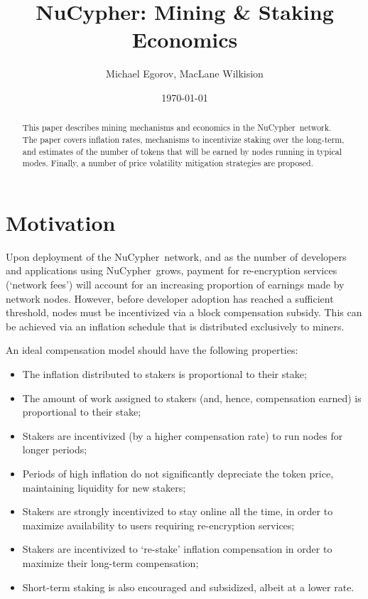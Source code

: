 \documentclass[longbibliography,nofootinbib,twocolumn]{revtex4-1}
\newcommand{\nucypher}{NuCypher}
\begin{document}
\title{\nucypher: Mining \& Staking Economics}

\author{Michael Egorov, MacLane Wilkision}

\begin{abstract}
This paper describes mining mechanisms and economics in the \nucypher~network.
The paper covers inflation rates, mechanisms to incentivize staking over the long-term,
and estimates of the number of tokens that will be earned by nodes running in typical modes.
Finally, a number of price volatility mitigation strategies are proposed.
\end{abstract}

\date{\today}
\maketitle

\section{Motivation}

Upon deployment of the \nucypher~network, and as the number of developers and applications using \nucypher~grows, payment for re-encryption services (`network fees') will account for an increasing proportion of earnings made by network nodes.
However, before developer adoption has reached a sufficient threshold, nodes must be incentivized via a block compensation subsidy.
This can be achieved via an inflation schedule that is distributed exclusively to miners.

An ideal compensation model should have the following properties:
\begin{itemize}
    \item The inflation distributed to stakers is proportional to their stake;
    \item The amount of work assigned to stakers (and, hence, compensation earned) is proportional to their stake;
    \item Stakers are incentivized (by a higher compensation rate) to run nodes for longer periods;
    \item Periods of high inflation do not significantly depreciate the token price, maintaining liquidity for new stakers;
    \item Stakers are strongly incentivized to stay online all the time, in order to maximize availability to users requiring re-encryption services;
    \item Stakers are incentivized to `re-stake' inflation compensation in order to maximize their long-term compensation;
    \item Short-term staking is also encouraged and subsidized, albeit at a lower rate.
\end{itemize}
\end{document}
